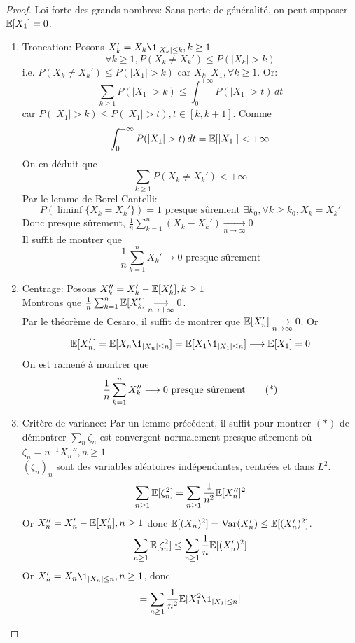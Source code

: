 \documentclass[]{report}
\begin{document}
    \begin{proof}
        Loi forte des grands nombres: Sans perte de généralité, on peut supposer $\mathbb{E}[X_1]=0$.\\
        \begin{enumerate}
            \item Troncation: Posons $X_k'=X_k\1_{|X_k|\le k},k\ge 1$
            \[\forall k\ge 1,P(X_k\neq X_k')\le P(|X_k|>k)\]
            i.e. $P(X_k\neq X_k')\le P(|X_1|>k)$ car $X_k$~$X_1,\forall k\ge 1$. Or:
            \[\sum_{k\ge 1}P(|X_1|>k)\le \int_{0}^{+\infty} P(|X_1|>t)\, dt\]
            car $P(|X_1|>k)\le P(|X_1|>t),t\in [k,k+1]$. Comme
            \[\int_{0}^{+\infty}P(|X_1|>t)\, dt=\Ea[|X_1|]<+\infty\]
            On en déduit que
            \[\sum_{k\ge 1}P(X_k\neq X_k')<+\infty\]
            Par le lemme de Borel-Cantelli:
            \[P(\liminf \{X_k=X_k'\})=1\text{ presque sûrement }\exists k_0,\forall k\ge k_0,X_k=X_k'\]
            Donc presque sûrement, $\frac{1}{n}\sum_{k=1}^{n}(X_k-X_k')\underset{n\to \infty}{\longrightarrow}0$\\
            Il suffit de montrer que
            \[\frac{1}{n}\sum_{k=1}^{n}X_k'\to 0\text{ presque sûrement}\]
            \item Centrage: Posons $X_k''=X_k'-\mathbb{E}[X_k'],k\ge 1$\\
            Montrons que $\frac{1}{n}\sum_{k=1}^{n}\mathbb{E}[X_k']\underset{n\to +\infty}{\longrightarrow}0$.\\
            Par le théorème de Cesaro, il suffit de montrer que $\mathbb{E}[X_n']\underset{n\to \infty}{\longrightarrow}0$. Or
            \[\Ea[X_n']=\Ea[X_n\1_{|X_n|\le n}]=\Ea[X_1\1_{|X_1|\le n}]\longrightarrow \Ea[X_1]=0\]
            On est ramené à montrer que
            \[\frac{1}{n}\sum_{k=1}^{n}X_k''\longrightarrow 0 \text{ presque sûrement\qquad (*)}\]
            \item Critère de variance: Par un lemme précédent, il suffit pour montrer $(*)$ de démontrer $\sum_{n}\zeta_n$ est convergent normalement presque sûrement où $\zeta_n=n^{-1}X_n'',n\ge 1$\\
            $(\zeta_n)_n$ sont des variables aléatoires indépendantes, centrées et dans $L^2$.
            \[\sum_{n\ge 1}\mathbb{E}[\zeta_n^2]=\sum_{n\ge 1}\frac{1}{n^2}\mathbb{E}[X_n'']^2\]
            Or $X_n''=X_n'-\mathbb{E}[X_n'],n\ge 1$ donc $\mathbb{E}[(X_n)^2]=\text{Var}(X_n')\le \mathbb{E}[(X_n')^2]$.
            \[\sum_{n\ge 1}\mathbb{E}[\zeta_n^2]\le \sum_{n\ge 1}\frac{1}{n}\mathbb{E}[(X_n')^2]\]
            Or $X_n'=X_n\1_{|X_n|\le n},n\ge 1$, donc
            \[=\sum_{n\ge 1}\frac{1}{n^2}\Ea[X_1^2\1_{|X_1|\le n}]\]

\end{enumerate}
\end{proof}
\end{document}
